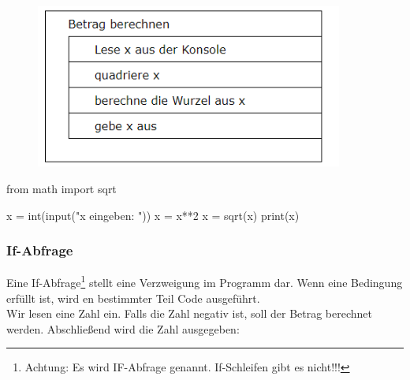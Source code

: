 \begin{minipage}{.45\textwidth}
\centering
\begin{figure}[H]
	\begin{center}
		\includegraphics[width=0.9\textwidth]{imgs/abs_long.png} %
	\end{center}
\end{figure}
\end{minipage}
\begin{minipage}{.45\textwidth}
\begin{python}
from math import sqrt

x = int(input("x eingeben: "))
x = x**2
x = sqrt(x)
print(x)
\end{python}
\end{minipage}
\subsubsection{If-Abfrage}
Eine If-Abfrage\footnote{Achtung: Es wird IF-Abfrage genannt. If-Schleifen gibt es nicht!!!} stellt eine Verzweigung im Programm dar. Wenn eine Bedingung erfüllt ist, wird en bestimmter Teil Code ausgeführt. \\
Wir lesen eine Zahl ein. Falls die Zahl negativ ist, soll der Betrag berechnet werden. Abschließend wird die Zahl ausgegeben:\\

